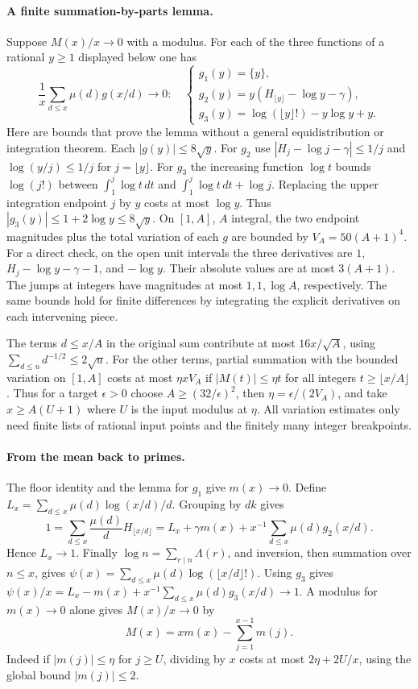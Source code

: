 \paragraph{A finite summation-by-parts lemma.}
Suppose $M(x)/x\to0$ with a modulus. For each of the three functions
of a rational $y\ge1$ displayed below one has
\[
 \frac1x\sum_{d\le x}\mu(d)g(x/d)\longrightarrow0:
 \quad
 \begin{cases}
  g_1(y)=\{y\},\\
  g_2(y)=y(H_{\lfloor y\rfloor}-\log y-\gamma),\\
  g_3(y)=\log(\lfloor y\rfloor !)-y\log y+y .
 \end{cases}
\]
Here are bounds that prove the lemma without a general equidistribution
or integration theorem. Each $|g(y)|\le8\sqrt y$. For $g_2$ use
$|H_j-\log j-\gamma|\le1/j$ and
$\log(y/j)\le1/j$ for $j=\lfloor y\rfloor$.
For $g_3$ the increasing function $\log t$ bounds $\log(j!)$ between
$\int_1^j\log t\,dt$ and $\int_1^j\log t\,dt+\log j$.
Replacing the upper integration endpoint $j$ by $y$ costs at most
$\log y$. Thus $|g_3(y)|\le 1+2\log y\le8\sqrt y$.
On $[1,A]$, $A$ integral, the two endpoint magnitudes plus the total
variation of each $g$ are bounded by $V_A=50(A+1)^4$.
For a direct check, on the open unit intervals the three derivatives are
$1$, $H_j-\log y-\gamma-1$, and $-\log y$. Their absolute values are
at most $3(A+1)$. The jumps at integers have magnitudes at most
$1,1,\log A$, respectively. The same bounds hold for finite differences
by integrating the explicit derivatives on each intervening piece.

The terms $d\le x/A$ in the original sum contribute at most
$16x/\sqrt A$, using $\sum_{d\le u}d^{-1/2}\le2\sqrt u$.
For the other terms, partial summation with the bounded variation on
$[1,A]$ costs at most $\eta x V_A$ if $|M(t)|\le\eta t$ for all
integers $t\ge\lfloor x/A\rfloor$. Thus for a target $\epsilon>0$
choose $A\ge(32/\epsilon)^2$, then $\eta=\epsilon/(2V_A)$, and take
$x\ge A(U+1)$ where $U$ is the input modulus at $\eta$.
All variation estimates only need finite lists of rational input points
and the finitely many integer breakpoints.

\paragraph{From the mean back to primes.}
The floor identity and the lemma for $g_1$ give $m(x)\to0$.
Define $L_x=\sum_{d\le x}\mu(d)\log(x/d)/d$. Grouping by $dk$ gives
\[
 1=\sum_{d\le x}\frac{\mu(d)}d H_{\lfloor x/d\rfloor}
  =L_x+\gamma m(x)+x^{-1}\sum_{d\le x}\mu(d)g_2(x/d).
\]
Hence $L_x\to1$. Finally $\log n=\sum_{r\mid n}\Lambda(r)$, and
inversion, then summation over $n\le x$, gives
$\psi(x)=\sum_{d\le x}\mu(d)\log(\lfloor x/d\rfloor!)$.
Using $g_3$ gives
$\psi(x)/x=L_x-m(x)+x^{-1}\sum_{d\le x}\mu(d)g_3(x/d)\to1$.
A modulus for $m(x)\to0$ alone gives $M(x)/x\to0$ by
\[
 M(x)=xm(x)-\sum_{j=1}^{x-1}m(j).
\]
Indeed if $|m(j)|\le\eta$ for $j\ge U$, dividing by $x$ costs at
most $2\eta+2U/x$, using the global bound $|m(j)|\le2$.

